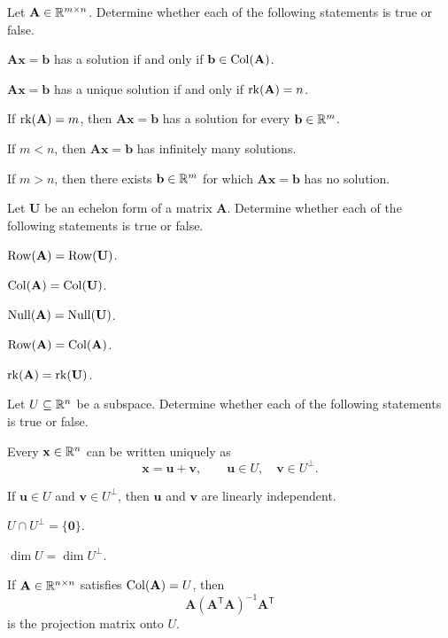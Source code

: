 \begin{problem}
Let $\mathbf A\in\mathbb{R}^{m\times n}$. Determine whether each of the following statements is true or false.
\begin{problemchoices}
\item $\mathbf A\mathbf x=\mathbf b$ has a solution if and only if $\mathbf b\in\operatorname{Col}(\mathbf A)$.
\item $\mathbf A\mathbf x=\mathbf b$ has a unique solution if and only if $\operatorname{rk}(\mathbf A)=n$.
\item If $\operatorname{rk}(\mathbf A)=m$, then $\mathbf A\mathbf x=\mathbf b$ has a solution for every $\mathbf b\in\mathbb{R}^m$.
\item If $m<n$, then $\mathbf A\mathbf x=\mathbf b$ has infinitely many solutions.
\item If $m>n$, then there exists $\mathbf b\in\mathbb{R}^m$ for which $\mathbf A\mathbf x=\mathbf b$ has no solution.
\end{problemchoices}
\end{problem}

\begin{problem}
Let $\mathbf U$ be an echelon form of a matrix $\mathbf A$. Determine whether each of the following statements is true or false.
\begin{problemchoices}
\item $\operatorname{Row}(\mathbf A)=\operatorname{Row}(\mathbf U)$.
\item $\operatorname{Col}(\mathbf A)=\operatorname{Col}(\mathbf U)$.
\item $\operatorname{Null}(\mathbf A)=\operatorname{Null}(\mathbf U)$.
\item $\operatorname{Row}(\mathbf A)=\operatorname{Col}(\mathbf A)$.
\item $\operatorname{rk}(\mathbf A)=\operatorname{rk}(\mathbf U)$.
\end{problemchoices}
\end{problem}

\begin{problem}
Let $U\subseteq\mathbb{R}^n$ be a subspace. Determine whether each of the following statements is true or false.
\begin{problemchoices}
\item Every $\mathbf x\in\mathbb{R}^n$ can be written uniquely as
\[
\mathbf x=\mathbf u+\mathbf v,
\qquad
\mathbf u\in U,
\quad
\mathbf v\in U^\perp.
\]
\item If $\mathbf u\in U$ and $\mathbf v\in U^\perp$, then $\mathbf u$ and $\mathbf v$ are linearly independent.
\item $U\cap U^\perp=\{\mathbf 0\}$.
\item $\dim U=\dim U^\perp$.
\item If $\mathbf A\in\mathbb{R}^{n\times n}$ satisfies $\operatorname{Col}(\mathbf A)=U$, then
\[
\mathbf A(\mathbf A^{\mathsf T}\mathbf A)^{-1}\mathbf A^{\mathsf T}
\]
is the projection matrix onto $U$.
\end{problemchoices}
\end{problem}

